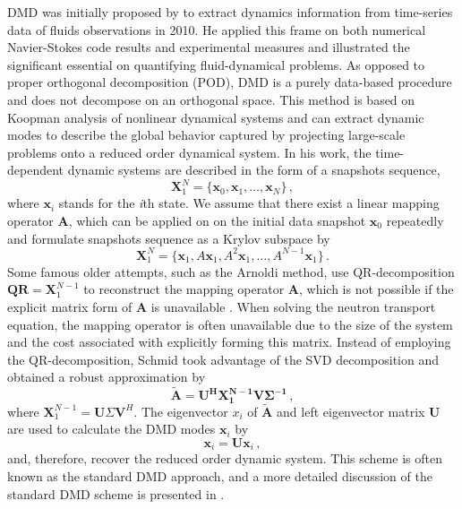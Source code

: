 DMD was initially proposed by \citet{schmid_dynamic_2010}\cite{schmid_applications_2011} to extract dynamics information from time-series data of fluids observations in 2010.
He applied this frame on both numerical Navier-Stokes code results and experimental measures and illustrated the significant essential on quantifying fluid-dynamical problems.
As opposed to proper orthogonal decomposition (POD)\cite{lumley2007stochastic}, DMD is a purely data-based procedure and does not decompose on an orthogonal space. 
This method is based on Koopman analysis\cite{lasota2013chaos,mezic2005spectral} of nonlinear dynamical systems and can extract dynamic modes to describe the global behavior captured by projecting large-scale problems onto a reduced order dynamical system.
In his work, the time-dependent dynamic systems are described in the form of a snapshots sequence,
\begin{equation}
 \mathbf{X}^{N}_1 = \{\mathbf{x}_0, \mathbf{x}_1, \ldots, \mathbf{x}_{N} \} \, ,
 \label{eq:snap_matrix}
\end{equation}
where $\mathbf{x}_i$ stands for the {\it i}th state.
We assume that there exist a linear mapping operator $\mathbf{A}$, which can be applied on on the initial data snapshot $\mathbf{x}_0$ repeatedly and formulate snapshots sequence  as a Krylov subspace by
\begin{equation}
 \mathbf{X}^{N}_1 = \{\mathbf{x}_1,A\mathbf{x}_1,A^2\mathbf{x}_1,…,A^{N-1}\mathbf{x}_1 \} \, .
 \label{eq:Krylov_seq}
\end{equation}
Some famous older attempts, such as the Arnoldi method\cite{arnoldi1951principle}, use QR-decomposition $\mathbf{QR} = \mathbf{X}^{N-1}_1$ to reconstruct the mapping operator $\mathbf{A}$, which is not possible if  the explicit matrix form of  $\mathbf{A}$ is unavailable \cite{Greenbaum_1997, trefethen1997numerical}.
When solving the neutron transport equation, the mapping operator is often unavailable due to the size of the system and the cost associated with explicitly forming this matrix.
Instead of employing the QR-decomposition, Schmid took advantage of the SVD decomposition and obtained a robust approximation by 
\begin{equation}
\mathbf{\tilde{A}} = \mathbf{U^H X_1^{N-1}V\Sigma^{-1}} \, ,
 \label{eq:stanard_DMD}
\end{equation}
where $\mathbf{X}_1^{N-1} = \mathbf{U}\Sigma \mathbf{V}^H$. 
The eigenvector $x_i$ of $\mathbf{\tilde{A}}$ and left eigenvector matrix $\mathbf{U}$ are used to calculate the DMD modes $\mathbf{\mathbf{x}}_i$ by 
\begin{equation}
\mathbf{\mathbf{x}}_i = \mathbf{U} \mathbf{x}_i \, ,
 \label{eq:dyanmic_modes}
\end{equation}
and, therefore, recover the reduced order dynamic system.
This scheme is often known as the standard DMD approach, and a more detailed discussion of the standard DMD scheme is presented in .   

